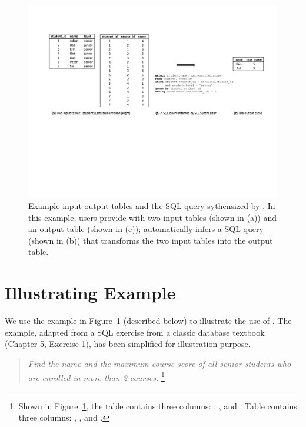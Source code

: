 
\begin{figure}[t]
  \centering
  \includegraphics[scale=0.70]{motivating}
  \vspace*{-1.0ex}\caption {{\label{fig:motivating}
  Example input-output tables and the SQL query sythensized by
  \ourtool. In this example, users provide \ourtool with
  two input tables (shown in (a)) and an output table (shown in (c));
  \ourtool automatically infers a SQL query (shown in (b)) that
  transforms the two input tables into the output table.
}}
\end{figure}

\section{Illustrating Example}
\label{sec:example}

We use the example in Figure~\ref{fig:motivating} (described below)
to illustrate the use of \ourtool. The example,
adapted from a SQL exercise from a classic
database textbook~\cite{cowbook} (Chapter 5, Exercise 1),
has been simplified for illustration purpose.

\begin{quote}
\textit{Find the name and the maximum course score of all senior students
who are enrolled in more than 2 courses.}
\footnote{
Shown in Figure~\ref{fig:motivating}, the  table
contains three columns: , ,
and . Table  contains
three columns: , ,
and .
}
\end{quote}


